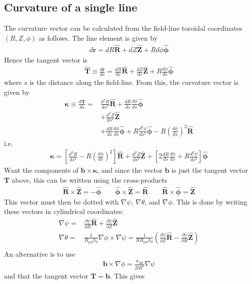 \documentclass[12pt]{article}
\def\L{\left}
\def\R{\right}
\newcommand{\sbt}{\ensuremath{\sigma_{B\theta}}}
\newcommand{\dd}[2]{\ensuremath{\frac{d #1}{d #2}}}
\newcommand{\ddd}[2]{\ensuremath{\frac{d^2 #1}{d #2^2}}}
\newcommand{\deriv}[2]{\ensuremath{\frac{\partial #1}{\partial #2}}}
\newcommand{\hthe}{\ensuremath{h_\theta}}
\newcommand{\Bp}{\ensuremath{B_{\text{pol}}}}
\newcommand{\ve}[1]{\ensuremath{\boldsymbol{#1}}}
\newcommand{\hv}[1]{\hat{\ve{#1}}}
\newcommand{\bvec}{\ve{b}}
\newcommand{\kvec}{\ve{\kappa}}
\newcommand{\Rvec}{\ensuremath{\hv{R}}}
\newcommand{\Zvec}{\ensuremath{\hv{Z}}}
\newcommand{\phivec}{\ensuremath{\hv{\phi}}}
\begin{document}
\subsection{Curvature of a single line}
%
The curvature vector can be calculated from the field-line toroidal coordinates
$\L(R,Z,\phi\R)$ as follows. The line element is given by
%
\begin{align*}
d\ve{r} = dR\Rvec + dZ\Zvec + Rd\phi\phivec
\end{align*}
%
Hence the tangent vector is
%
\begin{align*}
\hv{T} \equiv \dd{\ve{r}}{s} = \dd{R}{s}\Rvec + \dd{Z}{s}\Zvec +
R\dd{\phi}{s}\phivec
\end{align*}
%
where $s$ is the distance along the field-line. From this, the curvature vector
is given by
%
\begin{align*}
\kvec \equiv \dd{\ve{T}}{s} =& \ddd{R}{s}\Rvec + \dd{R}{s}\dd{\phi}{s}\phivec
    \\ &+ \ddd{Z}{s}\Zvec \\ &+ \dd{R}{s}\dd{\phi}{s}\phivec +
    R\ddd{\phi}{s}\phivec - R\L(\dd{\phi}{s}\R)^2 \Rvec
\end{align*}
%
i.e.
%
\begin{align}
\kvec = \L[\ddd{R}{s} - R\L(\dd{\phi}{s}\R)^2\R]\Rvec + \ddd{Z}{s}\Zvec +
\L[2\dd{R}{s}\dd{\phi}{s} + R\ddd{\phi}{s}\R]\phivec
\label{eq:kappaline}
\end{align}
%
Want the components of $\ve{b}\times\kvec$, and since the vector $\ve{b}$ is
just the tangent vector $\ve{T}$ above, this can be written using the
cross-products
%
\begin{align*}
\Rvec\times\Zvec = -\phivec \qquad \phivec\times\Zvec = \Rvec \qquad
\Rvec\times\phivec = \Zvec
\end{align*}
%
This vector must then be dotted with $\nabla\psi$, $\nabla\theta$, and
$\nabla\phi$. This is done by writing these vectors in cylindrical coordinates:
%
\begin{align*}
\nabla\psi =& \deriv{\psi}{R}\hv{R} + \deriv{\psi}{Z}\hv{Z} \\ \nabla\theta =&
    \frac{1}{\Bp\hthe}\nabla\phi\times\nabla\psi =
    \frac{1}{R\Bp\hthe}\L(\deriv{\psi}{Z}\hv{R} - \deriv{\psi}{R}\hv{Z}\R) \\
\end{align*}
%
An alternative is to use
%
\begin{align*}
\bvec \times \nabla\phi = \frac{\sbt}{BR^2}\nabla\psi
\end{align*}
%
and that the tangent vector $\ve{T} = \bvec$. This gives
\end{document}
